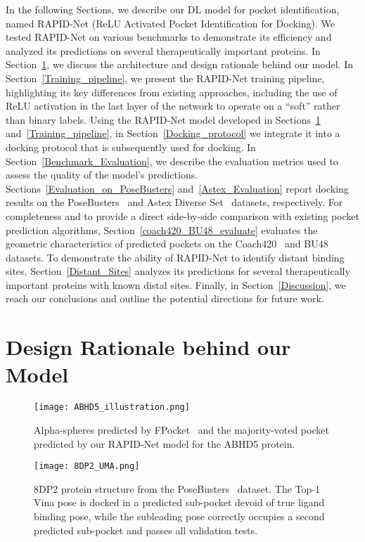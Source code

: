\documentclass[10pt,conference]{IEEEtran}
\begin{document}
In the following Sections, we describe our DL model for pocket identification, named RAPID-Net (ReLU Activated Pocket Identification for Docking). We tested RAPID-Net on various benchmarks to demonstrate its efficiency and analyzed its predictions on several therapeutically important proteins. In Section~\ref{Sec_Architecture}, we discuss the architecture and design rationale behind our model. In Section~\ref{Training_pipeline}, we present the RAPID-Net training pipeline, highlighting its key differences from existing approaches, including the use of ReLU activation in the last layer of the network to operate on a ``soft'' rather than binary labels. Using the RAPID-Net model developed in Sections~\ref{Sec_Architecture} and~\ref{Training_pipeline}, in Section~\ref{Docking_protocol} we integrate it into a docking protocol that is subsequently used for docking. In Section~\ref{Benchmark_Evaluation}, we describe the evaluation metrics used to assess the quality of the model's predictions. Sections~\ref{Evaluation_on_PoseBusters} and~\ref{Astex_Evaluation} report docking results on the PoseBusters~\cite{Buttenschoen2024} and Astex Diverse Set~\cite{hartshorn2007diverse} datasets, respectively. For completeness and to provide a direct side-by-side comparison with existing pocket prediction algorithms, Section~\ref{coach420_BU48_evaluate} evaluates the geometric characteristics of predicted pockets on the Coach420~\cite{Roy2012} and BU48~\cite{Huang2006} datasets. To demonstrate the ability of RAPID-Net to identify distant binding sites, Section~\ref{Distant_Sites} analyzes its predictions for several therapeutically important proteins with known distal sites. Finally, in Section~\ref{Discussion}, we reach our conclusions and outline the potential directions for future work.



\section{Design Rationale behind our Model}
\label{Sec_Architecture}

\begin{figure}[]{}
\texttt{[image: ABHD5\_illustration.png]}
  \caption{Alpha-spheres predicted by FPocket~\cite{le2009fpocket} and the majority-voted pocket predicted by our RAPID-Net model for the ABHD5 protein.}
\label{ABHD5_illustration_Fig}
\end{figure}

\begin{figure}[]{}
\texttt{[image: 8DP2\_UMA.png]}
  \caption{8DP2 protein structure from the PoseBusters~\cite{Buttenschoen2024} dataset. The Top-1 Vina pose is docked in a predicted sub-pocket devoid of true ligand binding pose, while the subleading pose correctly occupies a second predicted sub-pocket and passes all validation tests.}
\label{8DP2_UMA_Fig}
\end{figure}
\end{document}
